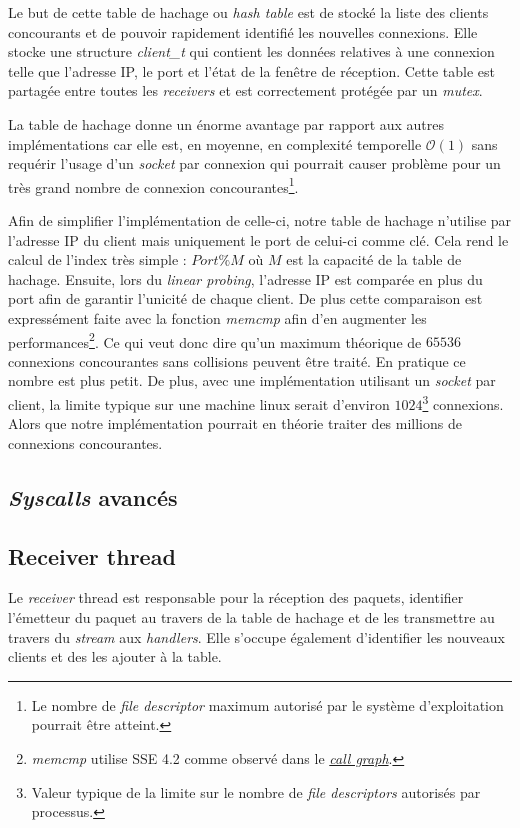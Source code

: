 \documentclass[../main.tex]{subfiles}
\begin{document}
Le but de cette table de hachage ou \textit{hash table} est de stocké la liste des clients concourants et de pouvoir rapidement identifié les nouvelles
connexions. Elle stocke une structure \textit{client\_t} qui contient les données relatives à une connexion telle que l'adresse IP, le port et l'état
de la fenêtre de réception. Cette table est partagée entre toutes les \textit{receivers} et est correctement protégée par un \textit{mutex}.

La table de hachage donne un énorme avantage par rapport aux autres implémentations car elle est, en moyenne, en complexité temporelle $\mathcal{O}(1)$
sans requérir l'usage d'un \textit{socket} par connexion qui pourrait causer problème pour un très grand nombre de connexion concourantes\footnote{
    Le nombre de \textit{file descriptor} maximum autorisé par le système d'exploitation pourrait être atteint.}.

Afin de simplifier l'implémentation de celle-ci, notre table de hachage n'utilise par l'adresse IP du client mais uniquement le port de celui-ci comme
clé. Cela rend le calcul de l'index très simple : $Port \% M$ où $M$ est la capacité de la table de hachage. Ensuite, lors du \textit{linear probing},
l'adresse IP est comparée en plus du port afin de garantir l'unicité de chaque client. De plus cette comparaison est expressément faite avec
la fonction \textit{memcmp} afin d'en augmenter les performances\footnote{ \textit{memcmp} utilise SSE 4.2 comme observé dans le \textit{\hyperref[sec:annexs_call_graph]{call graph}}.}.
Ce qui veut donc dire qu'un maximum théorique de $65536$ connexions concourantes sans collisions peuvent être traité. En pratique ce nombre
est plus petit. De plus, avec une implémentation utilisant un \textit{socket} par client, la limite typique sur une machine linux serait
d'environ $1024$\footnote{ Valeur typique de la limite sur le nombre de \textit{file descriptors} autorisés par processus.} connexions. Alors
que notre implémentation pourrait en théorie traiter des millions de connexions concourantes.

\subsection{\textit{Syscalls} avancés}
\label{sec:pipelines}

\subsection{Receiver thread}
\label{sec:receiver}

Le \textit{receiver} thread est responsable pour la réception des paquets, identifier l'émetteur du paquet au travers de la table de hachage
et de les transmettre au travers du \textit{stream} aux \textit{handlers}. Elle s'occupe également d'identifier les nouveaux clients et 
des les ajouter à la table. 
\end{document}
